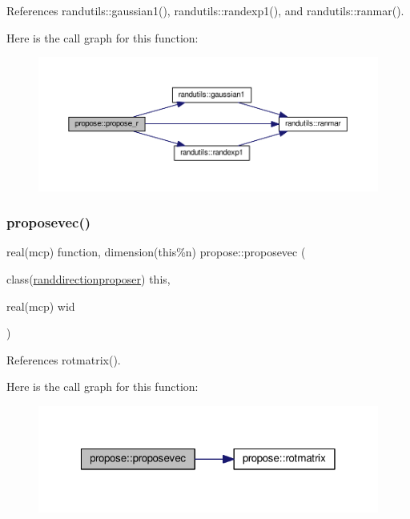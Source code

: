References randutils\+::gaussian1(), randutils\+::randexp1(), and randutils\+::ranmar().

Here is the call graph for this function\+:
\nopagebreak
\begin{figure}[H]
\begin{center}
\leavevmode
\includegraphics[width=350pt]{namespacepropose_a5181089142665b7ba3e73b0e8517744c_cgraph}
\end{center}
\end{figure}
\mbox{\label{namespacepropose_a2c9bb747ee6cc87964f354764f10d58c}} 
\subsubsection{\texorpdfstring{proposevec()}{proposevec()}}
{\footnotesize\ttfamily real(mcp) function, dimension(this\%n) propose\+::proposevec (\begin{DoxyParamCaption}\item[{class(\mbox{\hyperlink{structpropose_1_1randdirectionproposer}{randdirectionproposer}})}]{this,  }\item[{real(mcp)}]{wid }\end{DoxyParamCaption})}



References rotmatrix().

Here is the call graph for this function\+:
\nopagebreak
\begin{figure}[H]
\begin{center}
\leavevmode
\includegraphics[width=320pt]{namespacepropose_a2c9bb747ee6cc87964f354764f10d58c_cgraph}
\end{center}
\end{figure}
\mbox{\label{namespacepropose_a3315b3e0b92d1cf9fa29628d291634de}} 
